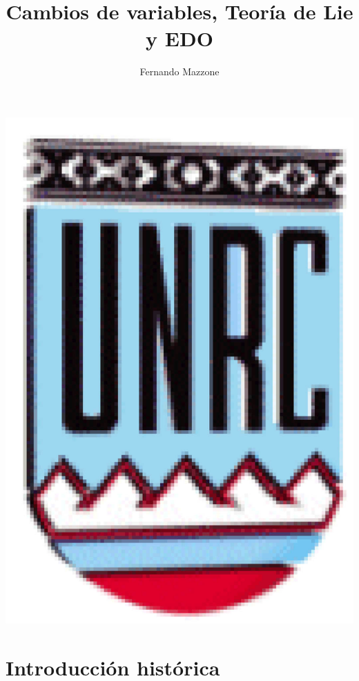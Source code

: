 \documentclass[handout,hyperref={colorlinks=true}]{beamer}
\title[Teoría de Lie y ODE] %
{%
Cambios de variables, Teoría de Lie y EDO
}
\author[] %
{Fernando Mazzone}
\institute[Depto de Matemática] %
{
 Depto de Matemática\\
Facultad de Ciencias Exactas Físico-Químicas y Naturales\\
Universidad Nacional de Río Cuarto}
\begin{document}
\begin{frame}
  \maketitle
  \begin{center}
   \includegraphics[scale=0.2]{imagenes/unrc.jpg}
   \end{center}
\end{frame}
\begin{frame}
\tableofcontents

\end{frame}

\section[Historia]{Introducción histórica}
\end{document}
